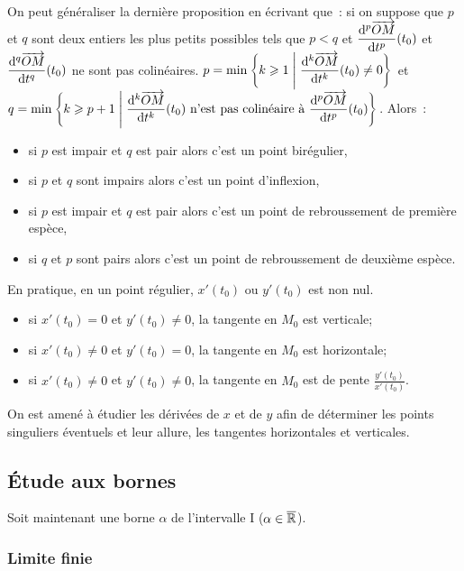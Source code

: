On peut généraliser la dernière proposition en écrivant que~: si on suppose que 
\(p\) et \(q\) sont deux entiers les plus petits possibles tels que \(p<q\) et 
\(\dfrac{\mathrm{d}^p \overrightarrow{OM}}{\mathrm{d} t^p}(t_0)\) et \(\dfrac{\mathrm{d}^q \overrightarrow{OM}}{\mathrm{d} 
t^q}(t_0)\) ne sont pas colinéaires. \(p = \min\left\{k\geqslant 1\mathrel{}\middle|\mathrel{}\dfrac{\mathrm{d}^k 
\overrightarrow{OM}}{\mathrm{d} t^k}(t_0) \neq 0\right\}\) et \(q = \min\left\{k\geqslant p + 
1\mathrel{}\middle|\mathrel{}\dfrac{\mathrm{d}^k \overrightarrow{OM}}{\mathrm{d} t^k}(t_0) \text{~n'est pas colinéaire à~} 
\dfrac{\mathrm{d}^p \overrightarrow{OM}}{\mathrm{d} t^p}(t_0)\right\}\). Alors~:
\begin{itemize}
  \item si \(p\) est impair et \(q\) est pair alors c'est un point birégulier,
  \item si \(p\) et \(q\) sont impairs alors c'est un point d'inflexion,
  \item si \(p\) est impair et \(q\) est pair alors c'est un point de 
    rebroussement de première espèce,
  \item si \(q\) et \(p\) sont pairs alors c'est un point de rebroussement de 
    deuxième espèce.
\end{itemize}

En pratique, en un point régulier, \(x'(t_0)\) ou \(y'(t_0)\) est non nul.

\begin{itemize}
  \item si \(x'(t_0)=0\) et \(y'(t_0) \neq 0\), la tangente en \(M_0\) est 
    verticale;
  \item si \(x'(t_0) \neq 0\) et \(y'(t_0) = 0\), la tangente en \(M_0\) est 
    horizontale;
  \item si \(x'(t_0) \neq 0\) et \(y'(t_0) \neq 0\), la tangente en \(M_0\) est 
    de pente \(\frac{y'(t_0)}{x'(t_0)}\).
\end{itemize}
On est amené à étudier les dérivées de \(x\) et de \(y\) afin de déterminer les 
points singuliers éventuels et leur allure, les tangentes horizontales et 
verticales.

\subsection{Étude aux bornes}
Soit maintenant une borne \(\alpha\) de l'intervalle I (\(\alpha \in 
\overline{\mathbb{R}}\)).

\subsubsection{Limite finie}

